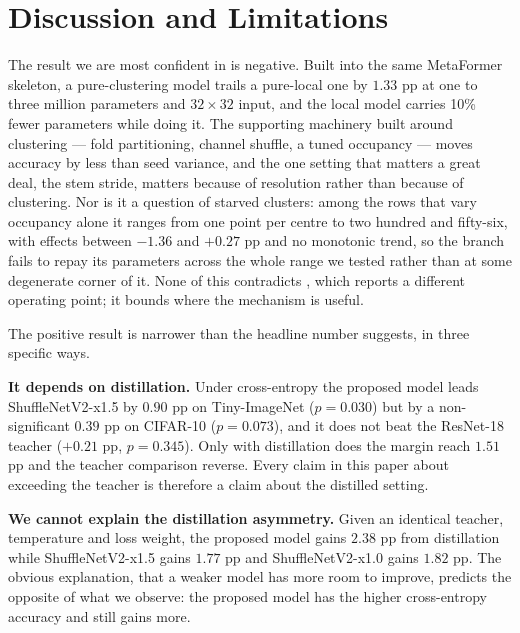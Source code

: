 
\section{Discussion and Limitations}
\label{sec:limits}

The result we are most confident in is negative. Built into the same
MetaFormer skeleton, a pure-clustering model trails a pure-local one by
$1.33$ pp at one to three million parameters and $32\times32$ input, and the
local model carries 10\% fewer parameters while doing it. The supporting
machinery built around clustering
--- fold partitioning, channel shuffle, a tuned occupancy --- moves accuracy
by less than seed variance, and the one setting that matters a great deal,
the stem stride, matters because of resolution rather than because of
clustering. Nor is it a question of starved clusters: among the rows that vary occupancy
alone it ranges from one point per centre to two hundred and fifty-six, with
effects between $-1.36$ and $+0.27$ pp and no monotonic trend, so the branch
fails to repay its parameters across the whole range we tested rather than at
some degenerate corner of it. None of this contradicts \cite{coc}, which
reports a different operating point; it bounds where the mechanism is
useful.

The positive result is narrower than the headline number suggests, in three
specific ways.

\textbf{It depends on distillation.} Under cross-entropy the proposed model
leads ShuffleNetV2-x1.5 by $0.90$ pp on Tiny-ImageNet ($p = 0.030$) but by a
non-significant $0.39$ pp on CIFAR-10 ($p = 0.073$), and it does not beat the
ResNet-18 teacher ($+0.21$ pp, $p = 0.345$). Only with distillation does the
margin reach $1.51$ pp and the teacher comparison reverse. Every claim in this paper about
exceeding the teacher is therefore a claim about the distilled setting.

\textbf{We cannot explain the distillation asymmetry.} Given an identical
teacher, temperature and loss weight, the proposed model gains $2.38$ pp from
distillation while ShuffleNetV2-x1.5 gains $1.77$ pp and ShuffleNetV2-x1.0
gains $1.82$ pp. The obvious explanation, that a weaker model has more room to
improve, predicts the opposite of what we observe: the proposed model has the
higher cross-entropy accuracy and still gains more.

